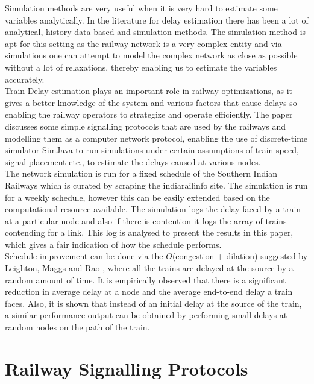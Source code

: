 \documentclass[twoside,11pt]{article}
\begin{document}
Simulation methods are very useful when it is very hard to estimate some variables analytically. In the literature for delay estimation there has been a lot of analytical, history data based and simulation methods. The simulation method is apt for this setting as the railway network is a very complex entity and via simulations one can attempt to model the complex network as close as possible without a lot of relaxations, thereby enabling us to estimate the variables accurately. \\


\indent Train Delay estimation plays an important role in railway optimizations, as it
gives a better knowledge of the system and various factors that cause delays so
enabling the railway operators to strategize and operate efficiently. The paper
discusses some simple signalling protocols that are used by the railways and
modelling them as a computer network protocol, enabling the use of discrete-time
simulator SimJava to run simulations under certain assumptions of train speed, 
signal placement etc., to estimate the delays caused at various nodes. \\

The network simulation is run for a fixed schedule of the Southern Indian Railways which is curated by scraping the indiarailinfo site. The simulation is run for a weekly schedule, however this can be easily extended based on the computational resource available. The simulation logs the delay faced by a train at a particular node and also if there is contention it logs the array of trains contending for a link. This log is analysed to present the results in this paper, which gives a fair indication of how the schedule performs. \\


Schedule improvement can be done via the $O$(congestion + dilation) suggested by Leighton, Maggs and Rao \cite{LMR}, where all the trains are delayed at the source by a random amount of time.
It is empirically observed that there is a significant reduction in average delay at a node and the average end-to-end delay a train faces. Also, it is shown that instead of an initial delay at the source of the train, a similar performance output can be obtained by performing small delays at random nodes on the path of the train.


\section{Railway Signalling Protocols}
\end{document}
